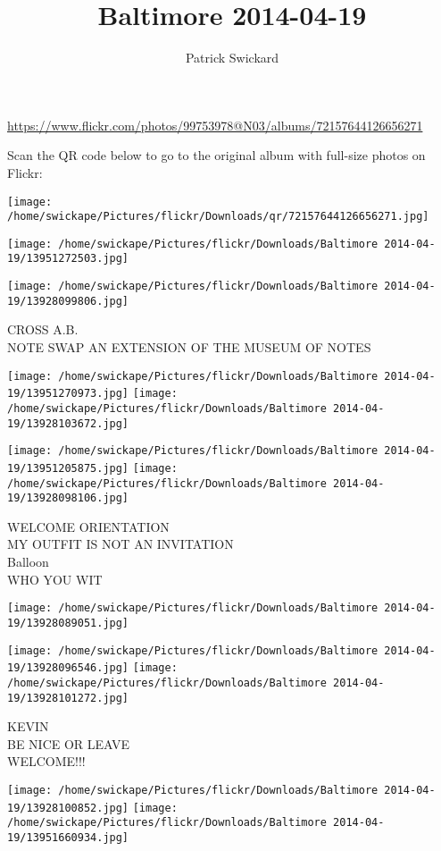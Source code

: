 \documentclass[10pt,letterpaper]{article}
\title{Baltimore 2014-04-19}
\author{Patrick Swickard}
\date{}
\begin{document}
\maketitle

\url{https://www.flickr.com/photos/99753978@N03/albums/72157644126656271}

Scan the QR code below to go to the original album with full-size photos on Flickr:

\texttt{[image: /home/swickape/Pictures/flickr/Downloads/qr/72157644126656271.jpg]}
\pagebreak

\texttt{[image: /home/swickape/Pictures/flickr/Downloads/Baltimore 2014-04-19/13951272503.jpg]}

\vspace{0.25in}
\texttt{[image: /home/swickape/Pictures/flickr/Downloads/Baltimore 2014-04-19/13928099806.jpg]}

CROSS A.B.\\
NOTE SWAP AN EXTENSION OF THE MUSEUM OF NOTES
\pagebreak

\texttt{[image: /home/swickape/Pictures/flickr/Downloads/Baltimore 2014-04-19/13951270973.jpg]}
\texttt{[image: /home/swickape/Pictures/flickr/Downloads/Baltimore 2014-04-19/13928103672.jpg]}

\texttt{[image: /home/swickape/Pictures/flickr/Downloads/Baltimore 2014-04-19/13951205875.jpg]}
\texttt{[image: /home/swickape/Pictures/flickr/Downloads/Baltimore 2014-04-19/13928098106.jpg]}

WELCOME ORIENTATION\\
MY OUTFIT IS NOT AN INVITATION\\
Balloon\\
WHO YOU WIT
\pagebreak

\texttt{[image: /home/swickape/Pictures/flickr/Downloads/Baltimore 2014-04-19/13928089051.jpg]}

\vspace{0.25in}
\texttt{[image: /home/swickape/Pictures/flickr/Downloads/Baltimore 2014-04-19/13928096546.jpg]}
\texttt{[image: /home/swickape/Pictures/flickr/Downloads/Baltimore 2014-04-19/13928101272.jpg]}

KEVIN\\
BE NICE OR LEAVE\\
WELCOME!!!
\pagebreak

\texttt{[image: /home/swickape/Pictures/flickr/Downloads/Baltimore 2014-04-19/13928100852.jpg]}
\texttt{[image: /home/swickape/Pictures/flickr/Downloads/Baltimore 2014-04-19/13951660934.jpg]}
\end{document}
